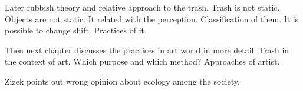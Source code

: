 
Later rubbish theory and relative approach to the trash. Trash is not static. Objects are not static. It related with the perception. Classification of them. It is possible to change shift. Practices of it.


Then next chapter discusses the practices in art world in more detail. Trash in the context of art. Which purpose and which method? Approaches of artist.






Zizek points out wrong opinion about ecology among the society.
